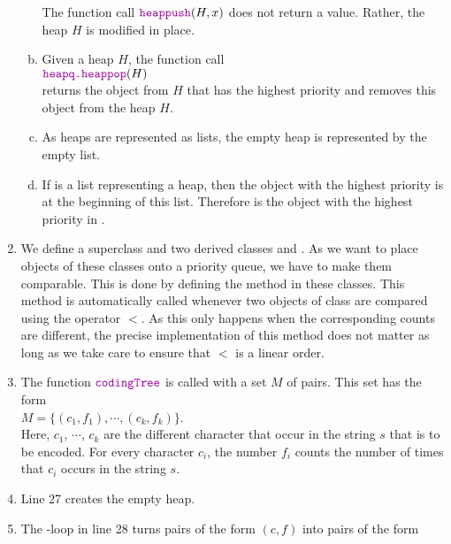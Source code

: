 \begin{enumerate}
\begin{enumerate}[(a)]
            The function call $\mytt{heappush}(H, x)$ does not return a value.  Rather, the heap $H$ is
            modified in place.
      \item Given a heap $H$, the function call
            \\[0.2cm]
            \hspace*{1.3cm}
            $\mytt{heapq.heappop}(H)$
            \\[0.2cm]
            returns the object from $H$ that has the highest priority and removes this object from the heap
            $H$.
      \item As heaps are represented as lists, the empty heap is represented by the empty list.
      \item If  is a list representing a heap, then the object with the highest priority is at the
            beginning of this list.  Therefore  is the object with the highest priority in .
      \end{enumerate}
\item We define a superclass  and two derived classes  and .
      As we want to place objects of these classes onto a priority queue, we have to make them comparable.
      This is done by defining the method  in these classes.  This method is automatically 
      called whenever two objects of class  are compared using the operator $<$.
      As this only happens when the corresponding counts are different, the precise implementation of this
      method does not matter as long as we take care to ensure that $<$ is a linear order.
\item The function $\mytt{codingTree}$ is called with a set  $M$ of pairs.  This set has the form
      \\[0.2cm]
      \hspace*{1.3cm}
      $M = \bigl\{ (c_1, f_1), \cdots, (c_k, f_k) \bigr\}$.
      \\[0.2cm]
      Here, $c_1$, $\cdots$, $c_k$ are the different character that occur in the string $s$ that is to be encoded. 
      For every character $c_i$, the number $f_i$ counts the number of times that $c_i$ occurs in the string
      $s$.
\item Line 27 creates the empty heap.
\item The -loop in line 28 turns pairs of the form $(c, f)$ into pairs of the form
      \\[0.2cm]
      \hspace*{1.3cm}

\end{enumerate}
